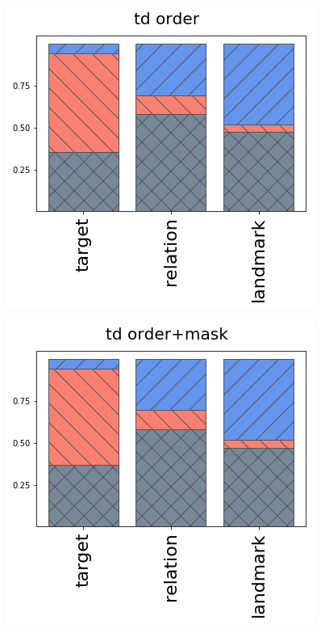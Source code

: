 \begin{figure}[ht!]
\begin{minipage}{0.3\linewidth}
	\end{minipage}\\
	\begin{minipage}{0.3\linewidth}
		\centering
		\includegraphics[width=\columnwidth]{studies/inlg2019/figures/results/attentions/models/td_order.png}\\
	\end{minipage}%
	\begin{minipage}{0.3\linewidth}
		\centering
		\includegraphics[width=\columnwidth]{studies/inlg2019/figures/results/attentions/models/td_order+mask.png}\\

\end{minipage}
\end{figure}
